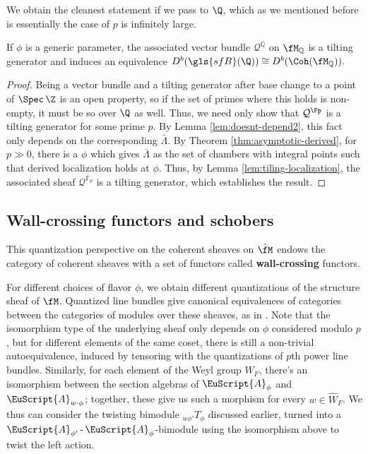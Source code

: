 We obtain the cleanest statement if we pass to $\Q$, which as we mentioned before is essentially the case of $p$ is infinitely large.
\begin{theorem}\label{th:Q-equiv}
  If $\phi$ is a generic parameter, the associated vector bundle $\mathcal{Q}^{\mathbb{Q}}$ on $\fM_{\mathbb{Q}}$ is a tilting generator and induces an equivalence $D^b(\gls{sfB}(\Q))\cong D^b(\Coh(\fM_{\mathbb{Q}})).$
\end{theorem}
\begin{proof}
   Being a vector bundle and a tilting generator after base change to a point of $\Spec\,
   \Z$ is an open property, so if the set of primes where this holds
   is non-empty, it must be so over $\Q$ as well.  Thus, we need only
   show that $\mathcal{Q}^{\Fp}$ is a tilting generator for some
   prime $p$.  By Lemma \ref{lem:doesnt-depend2}, this fact only
   depends on the corresponding $\bar \Lambda$.  By Theorem
   \ref{thm:asymptotic-derived}, for $p\gg 0$, there is a $\phi$ which
   gives $\bar \Lambda$ as the set of chambers with integral points
   such that derived localization holds at $\phi$.  Thus, by Lemma
   \ref{lem:tiling-localization}, the associated sheaf
   $\mathcal{Q}^{\mathbb{F}_p}$ is a tilting generator, which
   establishes the result.
\end{proof}

\subsection{Wall-crossing functors and schobers}

This quantization perspective on the coherent sheaves on $\tilde{\fM}$ endows the category of coherent sheaves with a set of functors called {\bf wall-crossing} functors. 

For different choices of flavor $\phi$, we obtain different quantizations of
the structure sheaf of $\fM$.  Quantized line bundles give canonical
equivalences of categories between the categories of modules over
these sheaves, as in \cite{BLPWquant}.  Note that the isomorphism type
of the underlying sheaf only depends on $\phi$ considered modulo $p$,
but for different elements of the same coset, there is still a
non-trivial autoequivalence, induced by tensoring with the
quantizations of $p$th power line bundles.  Similarly, for each
element of the Weyl group $W_F$, there's an isomorphism between the
section algebras of $\EuScript{A}_{\phi}$ and $ \EuScript{A}_{w\cdot
  \phi}$; together, these give us such a morphism for every $w\in
\widehat{W}_F$.  We thus can consider the twisting bimodule
${}_{w\phi'}T_{\phi}$ discussed earlier, turned into a
$\EuScript{A}_{\phi'}\operatorname{-}\EuScript{A}_{\phi}$-bimodule
using the isomorphism above to twist the left action.

